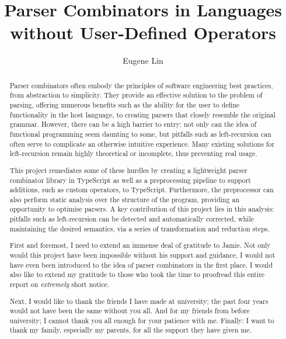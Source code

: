 \documentclass[a4paper, twoside, 11pt]{report}
\title{Parser Combinators in Languages without User-Defined Operators}
\author{Eugene Lin}
\begin{document}


\setcounter{abstractpage}{\value{page}}

\begin{abstract}
    \thispagestyle{plain}
    \setcounter{page}{\value{abstractpage}}

    Parser combinators often embody the principles of software engineering best practices, from abstraction to simplicity.
    They provide an effective solution to the problem of parsing, offering numerous benefits such as the ability for the user to define functionality in the host language, to creating parsers that closely resemble the original grammar.
    However, there can be a high barrier to entry: not only can the idea of functional programming seem daunting to some, but pitfalls such as left-recursion can often serve to complicate an otherwise intuitive experience.
    Many existing solutions for left-recursion remain highly theoretical or incomplete, thus preventing real usage.

    This project remediates some of these hurdles by creating a lightweight parser combinator library in TypeScript as well as a preprocessing pipeline to support additions, such as custom operators, to TypeScript.
    Furthermore, the preprocessor can also perform static analysis over the structure of the program, providing an opportunity to optimise parsers.
    A key contribution of this project lies in this analysis: pitfalls such as left-recursion can be detected and automatically corrected, while maintaining the desired semantics, via a series of transformation and reduction steps.

    \setcounter{abstractpage}{\value{page}}
\end{abstract}

\setcounter{page}{\value{abstractpage}}
\setcounter{abstractpage}{\value{page}}

\renewcommand{\abstractname}{Acknowledgements}
\begin{abstract}
    \thispagestyle{plain}
    \setcounter{page}{\value{abstractpage}}

    First and foremost, I need to extend an immense deal of gratitude to Jamie.
    Not only would this project have been impossible without his support and guidance, I would not have even been introduced to the idea of parser combinators in the first place.
    I would also like to extend my gratitude to those who took the time to proofread this entire report on \emph{extremely} short notice.

    Next, I would like to thank the friends I have made at university; the past four years would not have been the same without you all.
    And for my friends from before university; I cannot thank you all enough for your patience with me.
    Finally: I want to thank my family, especially my parents, for all the support they have given me.

    \setcounter{abstractpage}{\value{page}}
\end{abstract}
\end{document}
